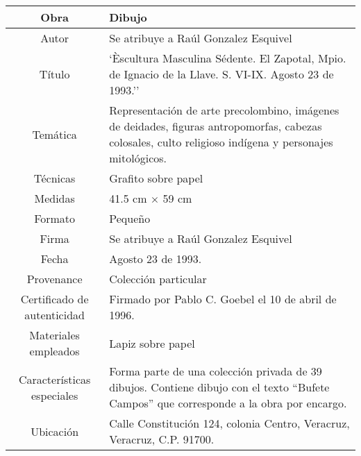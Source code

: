 \begin{table}[H]
\centering
\begin{tabular}{|c|m{}|}
\hline
Obra& Dibujo	\\
\hline
Autor & Se atribuye a Ra\'ul Gonzalez Esquivel\\
\hline
T\'itulo & `Èscultura Masculina S\'edente. El Zapotal, Mpio. de Ignacio de la Llave. S. VI-IX. Agosto 23 de 1993.'' \\
\hline
Tem\'atica & Representaci\'on de arte precolombino, im\'agenes de deidades, figuras antropomorfas, cabezas colosales, culto religioso ind\'igena y personajes mitol\'ogicos.\\
\hline
T\'ecnicas &Grafito sobre papel \\
\hline
Medidas & 41.5 cm $\times$ 59 cm \\
\hline
 Formato & Peque\~no \\
 \hline
 Firma &  Se atribuye a Ra\'ul Gonzalez Esquivel\\
 \hline
  Fecha & Agosto 23 de 1993. \\
 \hline
 Provenance & Colecci\'on particular\\
 \hline
 Certificado de autenticidad& Firmado por Pablo C. Goebel el 10 de abril de 1996.  \\
 \hline 
  Materiales empleados & Lapiz sobre papel\\
 \hline
 Caracter\'isticas especiales & Forma parte de una colecci\'on privada de 39 dibujos. 
Contiene dibujo con el texto ``Bufete Campos'' que corresponde a la obra por encargo. \\
\hline 
Ubicaci\'on & Calle Constituci\'on 124, colonia Centro, Veracruz, Veracruz, C.P. 91700.\\
\hline

\end{tabular}
\end{table}

